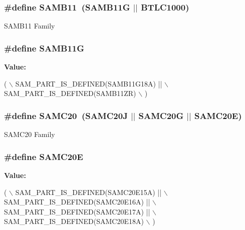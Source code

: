 \subsubsection[{S\+A\+M\+B11}]{\setlength{\rightskip}{0pt plus 5cm}\#define S\+A\+M\+B11~(S\+A\+M\+B11\+G $\vert$$\vert$ B\+T\+L\+C1000)}\label{group__sam__part__macros__group_ga2af5455979bc458995adea5aaa7807a2}
S\+A\+M\+B11 Family \hypertarget{group__sam__part__macros__group_ga9d75ea612675a9caabb228e7e0751ff7}{}
\subsubsection[{S\+A\+M\+B11\+G}]{\setlength{\rightskip}{0pt plus 5cm}\#define S\+A\+M\+B11\+G}\label{group__sam__part__macros__group_ga9d75ea612675a9caabb228e7e0751ff7}
{\bfseries Value\+:}
\begin{DoxyCode}
( \(\backslash\)
        SAM\_PART\_IS\_DEFINED(SAMB11G18A) || \(\backslash\)
        SAM\_PART\_IS\_DEFINED(SAMB11ZR) \(\backslash\)
    )
\end{DoxyCode}
\hypertarget{group__sam__part__macros__group_gaac043547d8783c0cba34b7d3139c53a0}{}
\subsubsection[{S\+A\+M\+C20}]{\setlength{\rightskip}{0pt plus 5cm}\#define S\+A\+M\+C20~(S\+A\+M\+C20\+J $\vert$$\vert$ S\+A\+M\+C20\+G $\vert$$\vert$ S\+A\+M\+C20\+E)}\label{group__sam__part__macros__group_gaac043547d8783c0cba34b7d3139c53a0}
S\+A\+M\+C20 Family \hypertarget{group__sam__part__macros__group_gafa6a3f9330468b268688f59c9baa8120}{}
\subsubsection[{S\+A\+M\+C20\+E}]{\setlength{\rightskip}{0pt plus 5cm}\#define S\+A\+M\+C20\+E}\label{group__sam__part__macros__group_gafa6a3f9330468b268688f59c9baa8120}
{\bfseries Value\+:}
\begin{DoxyCode}
( \(\backslash\)
        SAM\_PART\_IS\_DEFINED(SAMC20E15A) || \(\backslash\)
        SAM\_PART\_IS\_DEFINED(SAMC20E16A) || \(\backslash\)
        SAM\_PART\_IS\_DEFINED(SAMC20E17A) || \(\backslash\)
        SAM\_PART\_IS\_DEFINED(SAMC20E18A) \(\backslash\)
    )
\end{DoxyCode}
\hypertarget{group__sam__part__macros__group_gaae8339de60d66fd1ea8ab4d71500eee3}{}
